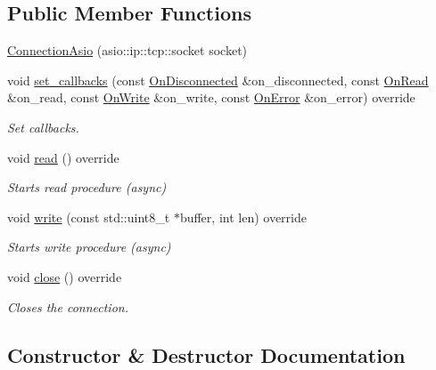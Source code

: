 \subsection*{Public Member Functions}
\begin{DoxyCompactItemize}
\item 
\hyperlink{classTcpBackend_1_1ConnectionAsio_a736274fefc6ca4d83e03085fe2acbb7f}{Connection\+Asio} (asio\+::ip\+::tcp\+::socket socket)
\item 
void \hyperlink{classTcpBackend_1_1ConnectionAsio_aee6f9ded99c8382d3daaf2aa3d8890ee}{set\+\_\+callbacks} (const \hyperlink{namespaceTcpBackend_a2ce9b1a1f46bfa6c4b1ad38c8aa262a6}{On\+Disconnected} \&on\+\_\+disconnected, const \hyperlink{namespaceTcpBackend_a7d2c9f63e8017af705255d4ed08264a7}{On\+Read} \&on\+\_\+read, const \hyperlink{namespaceTcpBackend_a670c71abc926680e1ea574a5f3a99135}{On\+Write} \&on\+\_\+write, const \hyperlink{namespaceTcpBackend_a17e8f044749312a6692cd0135565cbc4}{On\+Error} \&on\+\_\+error) override
\begin{DoxyCompactList}\small\item\em Set callbacks. \end{DoxyCompactList}\item 
void \hyperlink{classTcpBackend_1_1ConnectionAsio_a97faa75722fa9034ba03cf32512a6f22}{read} () override
\begin{DoxyCompactList}\small\item\em Starts read procedure (async) \end{DoxyCompactList}\item 
void \hyperlink{classTcpBackend_1_1ConnectionAsio_acca26b2c5f640224e1642e808138a580}{write} (const std\+::uint8\+\_\+t $\ast$buffer, int len) override
\begin{DoxyCompactList}\small\item\em Starts write procedure (async) \end{DoxyCompactList}\item 
void \hyperlink{classTcpBackend_1_1ConnectionAsio_a4601c22735a27b1a835bfa73d9842848}{close} () override
\begin{DoxyCompactList}\small\item\em Closes the connection. \end{DoxyCompactList}\end{DoxyCompactItemize}


\subsection{Constructor \& Destructor Documentation}
\mbox{\label{classTcpBackend_1_1ConnectionAsio_a736274fefc6ca4d83e03085fe2acbb7f}} 
